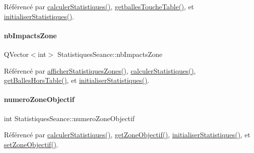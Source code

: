 Référencé par \hyperlink{class_statistiques_seance_a8bf60224113e3697adfe0a4f8f22ab7b}{calculer\+Statistiques()}, \hyperlink{class_statistiques_seance_a1f956e08733a81d0a86673cae6bc7feb}{getballes\+Touche\+Table()}, et \hyperlink{class_statistiques_seance_a17e1c49e2986a8490ff96e4bd7733291}{initialiser\+Statistiques()}.

\mbox{\label{class_statistiques_seance_aa4a040cda282d5b1c250025f8e191e20}} 
\paragraph{\texorpdfstring{nb\+Impacts\+Zone}{nbImpactsZone}}
{\footnotesize\ttfamily Q\+Vector$<$int$>$ Statistiques\+Seance\+::nb\+Impacts\+Zone\hspace{0.3cm}{\ttfamily [private]}}



Référencé par \hyperlink{class_statistiques_seance_afd9087c34222c0b2c0db11c5a96459c4}{afficher\+Statistiques\+Zones()}, \hyperlink{class_statistiques_seance_a8bf60224113e3697adfe0a4f8f22ab7b}{calculer\+Statistiques()}, \hyperlink{class_statistiques_seance_a26b717d40065e7afd80465458f3cb6aa}{get\+Balles\+Hors\+Table()}, et \hyperlink{class_statistiques_seance_a17e1c49e2986a8490ff96e4bd7733291}{initialiser\+Statistiques()}.

\mbox{\label{class_statistiques_seance_a23226867e4a34cb41f8c07f3d8d42e49}} 
\paragraph{\texorpdfstring{numero\+Zone\+Objectif}{numeroZoneObjectif}}
{\footnotesize\ttfamily int Statistiques\+Seance\+::numero\+Zone\+Objectif\hspace{0.3cm}{\ttfamily [private]}}



Référencé par \hyperlink{class_statistiques_seance_a8bf60224113e3697adfe0a4f8f22ab7b}{calculer\+Statistiques()}, \hyperlink{class_statistiques_seance_a61c01cb1d35cda871e8243658213ee5b}{get\+Zone\+Objectif()}, \hyperlink{class_statistiques_seance_a17e1c49e2986a8490ff96e4bd7733291}{initialiser\+Statistiques()}, et \hyperlink{class_statistiques_seance_af7c8281e195c0822463e6747bd0695ef}{set\+Zone\+Objectif()}.

